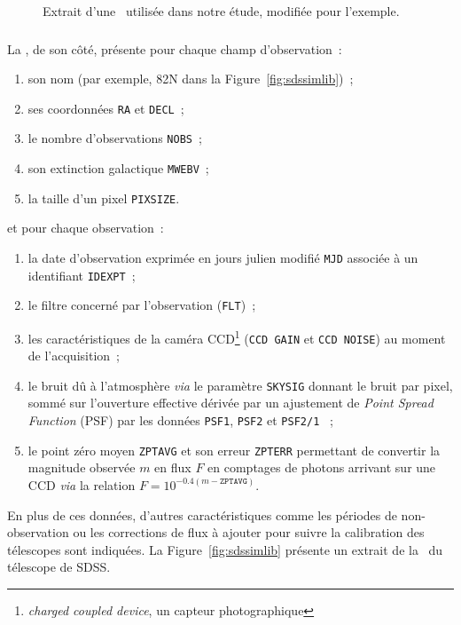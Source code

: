 \documentclass[../main/main.tex]{subfiles}
\begin{document}
\begin{figure}[]
    \centerfloat
        \caption[Extrait d'une \hostlib\ utilisée dans notre étude]{Extrait
        d'une \hostlib\ utilisée dans notre étude, modifiée pour l'exemple.}
    \label{fig:nrenv}
\end{figure}

\subsubsection{\simlib}\label{sssec:simlib}

La \simlib, de son côté, présente pour chaque champ d'observation~:
\begin{enumerate}
    \item son nom (par exemple, 82N dans la Figure~\ref{fig:sdssimlib})~;
    \item ses coordonnées \texttt{RA} et \texttt{DECL}~;
    \item le nombre d'observations \texttt{NOBS}~;
    \item son extinction galactique \texttt{MWEBV}~;
    \item la taille d'un pixel \texttt{PIXSIZE}.
\end{enumerate}
et pour chaque observation~:
\begin{enumerate}[resume]
    \item la date d'observation exprimée en jours julien modifié \texttt{MJD}
        associée à un identifiant \texttt{IDEXPT}~;
    \item le filtre concerné par l'observation (\texttt{FLT})~;
    \item les caractéristiques de la caméra CCD\footnote{\textit{charged coupled
        device}, un capteur photographique} (\texttt{CCD GAIN} et \texttt{CCD
        NOISE}) au moment de l'acquisition~;
    \item le bruit dû à l'atmosphère \textit{via} le paramètre \texttt{SKYSIG}
        donnant le bruit par pixel, sommé sur l'ouverture effective dérivée par
        un ajustement de \textit{Point Spread Function} (PSF) par les données
        \texttt{PSF1}, \texttt{PSF2} et \texttt{PSF2/1} \citep[voir Section~2
        de][pour les détails]{kessler2009a}~;
    \item le point zéro moyen \texttt{ZPTAVG} et son erreur \texttt{ZPTERR}
        permettant de convertir la magnitude observée $m$ en flux $F$ en
        comptages de photons arrivant sur une CCD \textit{via} la relation $F =
        10^{-0.4(m-\texttt{ZPTAVG})}$.
\end{enumerate}
En plus de ces données, d'autres caractéristiques comme les périodes de
non-observation ou les corrections de flux à ajouter pour suivre la calibration
des télescopes sont indiquées. La Figure~\ref{fig:sdssimlib} présente un extrait
de la \simlib\ du télescope de SDSS.
\end{document}
